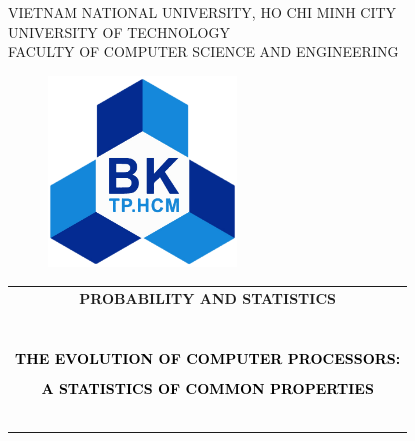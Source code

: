 \documentclass[a4paper]{report}
\author{}
\title{}
\date{}
\begin{document}
\renewcommand{\thelstlisting}{\arabic{chapter}.\arabic{section}.\arabic{lstlisting}}

\begin{titlepage}
  \begin{center}
    VIETNAM NATIONAL UNIVERSITY, HO CHI MINH CITY\\
    UNIVERSITY OF TECHNOLOGY\\
    FACULTY OF COMPUTER SCIENCE AND ENGINEERING
  \end{center}

  \vspace{1cm}

  \begin{figure}[ht]
    \centering
    \includegraphics[width=5cm]{hcmut.png}
  \end{figure}

  \vspace{1cm}

  \begin{center}
    \begin{tabular}{c}
      \multicolumn{1}{c}{\textbf{{\Large \color{blue} PROBABILITY AND STATISTICS}}} \\ \\
      ~~                                                                            \\
      \hline
      \\
      \textcolor{black}{\textbf{{\Large THE EVOLUTION OF COMPUTER PROCESSORS:}}}    \\\\
      \textcolor{black}{\textbf{{\Large A STATISTICS OF COMMON PROPERTIES}}}        \\
      ~~                                                                            \\
      \hline
      \\
    \end{tabular}
  \end{center}


\end{titlepage}
\end{document}
